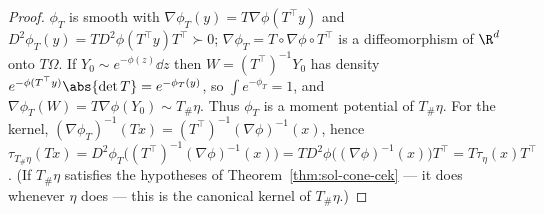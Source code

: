 \documentclass[../main.tex]{subfiles}
\begin{document}
\begin{proof}
$\phi_T$ is smooth with $\nabla\phi_T(y)=T\nabla\phi(T^\top y)$ and
$D^2\phi_T(y)=TD^2\phi(T^\top y)T^\top\succ0$; $\nabla\phi_T=T\circ\nabla\phi\circ T^\top$ is
a diffeomorphism of $\R^d$ onto $T\Omega$.  If $Y_0\sim e^{-\phi(z)}\dd z$ then
$W=(T^\top)^{-1}Y_0$ has density $e^{-\phi(T^\top y)}\abs{\det T}=e^{-\phi_T(y)}$, so
$\int e^{-\phi_T}=1$, and $\nabla\phi_T(W)=T\nabla\phi(Y_0)\sim T_\#\eta$.  Thus $\phi_T$ is a
moment potential of $T_\#\eta$.  For the kernel, $(\nabla\phi_T)^{-1}(Tx)=(T^\top)^{-1}(\nabla\phi)^{-1}(x)$,
hence $\tau_{T_\#\eta}(Tx)=D^2\phi_T\bigl((T^\top)^{-1}(\nabla\phi)^{-1}(x)\bigr)
=TD^2\phi\bigl((\nabla\phi)^{-1}(x)\bigr)T^\top=T\tau_\eta(x)T^\top$.  (If $T_\#\eta$ satisfies
the hypotheses of Theorem~\ref{thm:sol-cone-cek} --- it does whenever $\eta$ does --- this is the
canonical kernel of $T_\#\eta$.)
\end{proof}
\end{document}
